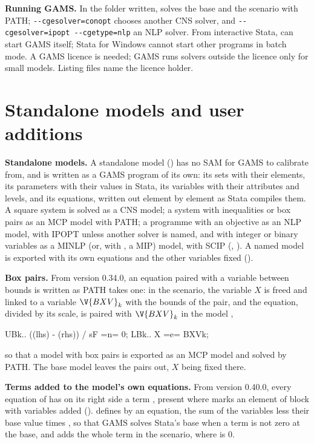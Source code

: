 \textbf{Running GAMS.} In the folder written,  solves the
base and the scenario with PATH; \texttt{-{}-cgesolver=conopt} chooses another
CNS solver, and \texttt{-{}-cgesolver=ipopt -{}-cgetype=nlp} an NLP solver. From
interactive Stata,  can start GAMS itself; Stata for Windows
cannot start other programs in batch mode. A GAMS licence is needed; GAMS runs
solvers outside the licence only for small models. Listing files name the
licence holder.

\section{Standalone models and user additions}\label{sec:gams-user}

\textbf{Standalone models.} A standalone model () has
no SAM for GAMS to calibrate from, and is written as a GAMS program of its
own: its sets with their elements, its parameters with their values in
Stata, its variables with their attributes and levels, and its equations,
written out element by element as Stata compiles them. A square system is
solved as a CNS model; a system with inequalities or box pairs as an MCP
model with PATH; a programme with an objective as an NLP model, with IPOPT
unless another solver is named, and with integer or binary variables as a
MINLP (or, with , a MIP) model, with SCIP
(, ). A named model is exported with its
own equations and the other variables fixed ().

\textbf{Box pairs.} From version 0.34.0, an equation paired with a variable
between bounds is written as PATH takes one: in the scenario, the variable
$X$ is freed and linked to a variable $\V{BXV}_k$ with the bounds of the
pair, and the equation, divided by its scale, is paired with $\V{BXV}_k$ in
the model ,
\begin{filecode}
UBk..  ((lhs) - (rhs)) / sF =n= 0;
LBk..  X =e= BXVk;
\end{filecode}
so that a model with box pairs is exported as an MCP model and solved by
PATH. The base model leaves the pairs out, $X$ being fixed there.

\textbf{Terms added to the model's own equations.} From version 0.40.0, every
equation of  has on its right side a term
, present where  marks an element of block
 with variables added (). 
defines  by an equation, the sum of the variables less their base
value times , so that GAMS solves Stata's base when a term is not
zero at the base, and adds the whole term in the scenario, where
 is 0.

